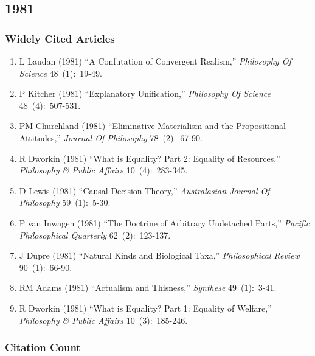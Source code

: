 \documentclass[
  10pt,
  letterpaper,
  DIV=11,
  numbers=noendperiod,
  twoside]{scrartcl}
\providecommand{\tightlist}{%
  \setlength{\itemsep}{0pt}\setlength{\parskip}{0pt}}\usepackage{longtable,booktabs,array}
\begin{document}
\newpage

\subsection{1981}\label{sec-s1981}

\subsubsection*{Widely Cited Articles}\label{widely-cited-articles-24}

\begin{enumerate}
\def\labelenumi{\arabic{enumi}.}
\tightlist
\item
  L Laudan (1981) ``A Confutation of Convergent Realism,''
  \emph{Philosophy Of Science} 48~(1):~19-49.
\item
  P Kitcher (1981) ``Explanatory Unification,'' \emph{Philosophy Of
  Science} 48~(4):~507-531.
\item
  PM Churchland (1981) ``Eliminative Materialism and the Propositional
  Attitudes,'' \emph{Journal Of Philosophy} 78~(2):~67-90.
\item
  R Dworkin (1981) ``What is Equality? Part 2: Equality of Resources,''
  \emph{Philosophy \& Public Affairs} 10~(4):~283-345.
\item
  D Lewis (1981) ``Causal Decision Theory,'' \emph{Australasian Journal
  Of Philosophy} 59~(1):~5-30.
\item
  P van Inwagen (1981) ``The Doctrine of Arbitrary Undetached Parts,''
  \emph{Pacific Philosophical Quarterly} 62~(2):~123-137.
\item
  J Dupre (1981) ``Natural Kinds and Biological Taxa,''
  \emph{Philosophical Review} 90~(1):~66-90.
\item
  RM Adams (1981) ``Actualism and Thisness,'' \emph{Synthese}
  49~(1):~3-41.
\item
  R Dworkin (1981) ``What is Equality? Part 1: Equality of Welfare,''
  \emph{Philosophy \& Public Affairs} 10~(3):~185-246.
\end{enumerate}

\subsubsection*{Citation Count}\label{sec-count-1981}
\end{document}
